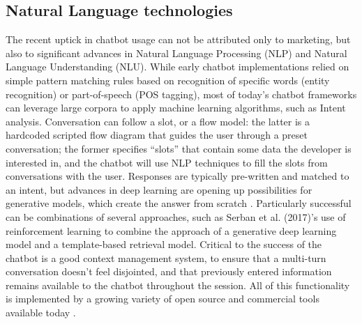 \subsection{Natural Language technologies}
The recent uptick in chatbot usage can not be attributed only to marketing, but also to significant advances in Natural Language Processing (NLP) and Natural Language Understanding (NLU). 
While early chatbot implementations relied on simple pattern matching rules based on recognition of specific words (entity recognition) or part-of-speech (POS tagging), most of today's chatbot frameworks can leverage large corpora to apply machine learning algorithms, such as Intent analysis. Conversation can follow a slot, or a flow model: the latter is a hardcoded scripted flow diagram that guides the user through a preset conversation; the former specifies ``slots'' that contain some data the developer is interested in, and the chatbot will use NLP techniques to fill the slots from conversations with the user. Responses are typically pre-written and matched to an intent, but advances in deep learning are opening up possibilities for generative models, which create the answer from scratch \cite{Gregori}. Particularly successful can be combinations of several approaches, such as Serban et al. (2017)\cite{Serban2017}'s use of reinforcement learning to combine the approach of a generative deep learning model and a template-based retrieval model. Critical to the success of the chatbot is a good context management system, to ensure that a multi-turn conversation doesn't feel disjointed, and that previously entered information remains available to the chatbot throughout the session. All of this functionality is implemented by a growing variety of open source and commercial tools available today \cite{JavierCouto}.
